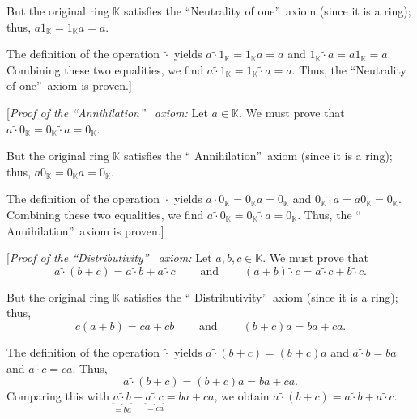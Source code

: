 \documentclass[paper=a4, fontsize=12pt]{scrartcl}%
\theoremstyle{plainsl}
\theoremstyle{definition}
\theoremstyle{remark}
\begin{document}
But the original ring $\mathbb{K}$ satisfies the \textquotedblleft Neutrality
of one\textquotedblright\ axiom (since it is a ring); thus, $a1_{\mathbb{K}%
}=1_{\mathbb{K}}a=a$.

The definition of the operation $\left.  \widetilde{\cdot}\right.  $ yields
$a\left.  \widetilde{\cdot}\right.  1_{\mathbb{K}}=1_{\mathbb{K}}a=a$ and
$1_{\mathbb{K}}\left.  \widetilde{\cdot}\right.  a=a1_{\mathbb{K}}=a$.
Combining these two equalities, we find $a\left.  \widetilde{\cdot}\right.
1_{\mathbb{K}}=1_{\mathbb{K}}\left.  \widetilde{\cdot}\right.  a=a$. Thus, the
\textquotedblleft Neutrality of one\textquotedblright\ axiom is proven.]

[\textit{Proof of the \textquotedblleft Annihilation\textquotedblright%
\ axiom:} Let $a\in\mathbb{K}$. We must prove that $a\left.  \widetilde{\cdot
}\right.  0_{\mathbb{K}}=0_{\mathbb{K}}\left.  \widetilde{\cdot}\right.
a=0_{\mathbb{K}}$.

But the original ring $\mathbb{K}$ satisfies the \textquotedblleft
Annihilation\textquotedblright\ axiom (since it is a ring); thus,
$a0_{\mathbb{K}}=0_{\mathbb{K}}a=0_{\mathbb{K}}$.

The definition of the operation $\left.  \widetilde{\cdot}\right.  $ yields
$a\left.  \widetilde{\cdot}\right.  0_{\mathbb{K}}=0_{\mathbb{K}%
}a=0_{\mathbb{K}}$ and $0_{\mathbb{K}}\left.  \widetilde{\cdot}\right.
a=a0_{\mathbb{K}}=0_{\mathbb{K}}$. Combining these two equalities, we find
$a\left.  \widetilde{\cdot}\right.  0_{\mathbb{K}}=0_{\mathbb{K}}\left.
\widetilde{\cdot}\right.  a=0_{\mathbb{K}}$. Thus, the \textquotedblleft
Annihilation\textquotedblright\ axiom is proven.]

[\textit{Proof of the \textquotedblleft Distributivity\textquotedblright%
\ axiom:} Let $a,b,c\in\mathbb{K}$. We must prove that%
\[
a\left.  \widetilde{\cdot}\right.  \left(  b+c\right)  =a\left.
\widetilde{\cdot}\right.  b+a\left.  \widetilde{\cdot}\right.
c\ \ \ \ \ \ \ \ \ \ \text{and}\ \ \ \ \ \ \ \ \ \ \left(  a+b\right)  \left.
\widetilde{\cdot}\right.  c=a\left.  \widetilde{\cdot}\right.  c+b\left.
\widetilde{\cdot}\right.  c.
\]


But the original ring $\mathbb{K}$ satisfies the \textquotedblleft
Distributivity\textquotedblright\ axiom (since it is a ring); thus,%
\[
c\left(  a+b\right)  =ca+cb\ \ \ \ \ \ \ \ \ \ \text{and}%
\ \ \ \ \ \ \ \ \ \ \left(  b+c\right)  a=ba+ca.
\]


The definition of the operation $\left.  \widetilde{\cdot}\right.  $ yields
$a\left.  \widetilde{\cdot}\right.  \left(  b+c\right)  =\left(  b+c\right)
a$ and $a\left.  \widetilde{\cdot}\right.  b=ba$ and $a\left.
\widetilde{\cdot}\right.  c=ca$. Thus,%
\[
a\left.  \widetilde{\cdot}\right.  \left(  b+c\right)  =\left(  b+c\right)
a=ba+ca.
\]
Comparing this with $\underbrace{a\left.  \widetilde{\cdot}\right.  b}%
_{=ba}+\underbrace{a\left.  \widetilde{\cdot}\right.  c}_{=ca}=ba+ca$, we
obtain $a\left.  \widetilde{\cdot}\right.  \left(  b+c\right)  =a\left.
\widetilde{\cdot}\right.  b+a\left.  \widetilde{\cdot}\right.  c$.
\end{document}

